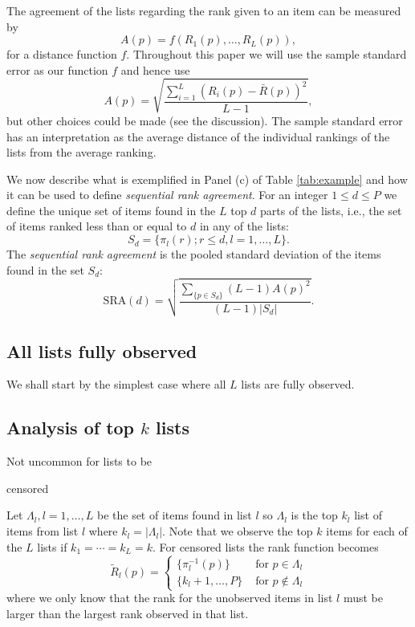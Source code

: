 \documentclass[12pt,a4paper]{article}\usepackage[]{graphicx}\usepackage[]{color}
\begin{document}
The agreement of the lists regarding the rank given to an item can be
measured by
\begin{equation}
  A(p) = f(R_1(p), \ldots, R_L(p)),
\end{equation}
for a distance function $f$. Throughout this paper we will use the
sample standard error as our function $f$ and hence use
$$A(p) = \sqrt{\frac{\sum_{i=1}^L (R_i(p) - \bar{R}(p))^2}{L-1}},
$$
but other choices could be made (see the discussion). The sample
standard error has an interpretation as the average distance of the
individual rankings of the lists from the average ranking.

We now describe what is exemplified in Panel (c) of Table
\ref{tab:example} and how it can be used to define \emph{sequential
  rank agreement}. For an integer $1\le d\le P$ we define the unique
set of items found in the $L$ top $d$ parts of the lists, i.e., the
set of items ranked less than or equal to $d$ in any of the lists:
\begin{equation}
S_d = \{\pi_l(r) ; r \leq d, l = 1, \ldots, L \}.
\end{equation}
The \emph{sequential rank agreement} is the pooled standard deviation
of the items found in the set $S_d$:
\begin{equation}
\textrm{SRA}(d)= \sqrt{\frac{\sum_{\{p \in S_d\}}(L-1)A(p)^2}{(L-1)|S_d|}}.
\end{equation}

\subsection{All lists fully observed}
We shall start by the simplest case where all $L$ lists are fully observed. 

\subsection{Analysis of top $k$ lists}
Not uncommon for lists to be 


censored


Let $\Lambda_l, l=1, \ldots, L$ be the set of items found in list $l$
so $\Lambda_l$ is the top $k_l$ list of items from list $l$ where $k_l
= |\Lambda_l|$. Note that we observe the top $k$ items for each of the
$L$ lists if $k_1=\cdots=k_L=k$. For censored lists the rank function
becomes
\begin{equation}
\tilde R_l(p) = \left\{\begin{array}{cl} \{\pi_l^{-1}(p)\} & \text{ for } p\in \Lambda_l \\ 
\{k_l+1,\dots,P\} & \text{ for } p \not\in \Lambda_l\end{array}\right.
\end{equation}
where we only know that the rank for the unobserved items in list $l$ must be larger than the largest rank observed in that list.
\end{document}
